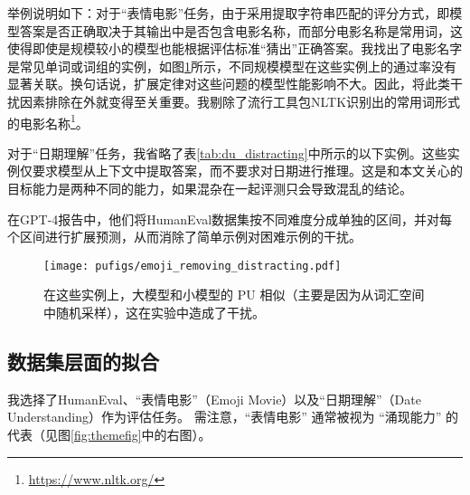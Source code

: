 举例说明如下：对于“表情电影”任务，由于采用提取字符串匹配的评分方式，即模型答案是否正确取决于其输出中是否包含电影名称，而部分电影名称是常用词，这使得即使是规模较小的模型也能根据评估标准“猜出”正确答案。我找出了电影名字是常见单词或词组的实例，如图\ref{fig:emoji_common_words}所示，不同规模模型在这些实例上的通过率没有显著关联。换句话说，扩展定律对这些问题的模型性能影响不大。因此，将此类干扰因素排除在外就变得至关重要。我剔除了流行工具包NLTK识别出的常用词形式的电影名称\footnote{\url{https://www.nltk.org/}}。

对于“日期理解”任务，我省略了表\ref{tab:du_distracting}中所示的以下实例。这些实例仅要求模型从上下文中提取答案，而不要求对日期进行推理。这是和本文关心的目标能力是两种不同的能力，如果混杂在一起评测只会导致混乱的结论。

在GPT-4报告\citep{openai2023gpt4}中，他们将HumanEval数据集按不同难度分成单独的区间，并对每个区间进行扩展预测，从而消除了简单示例对困难示例的干扰。

\begin{table}[!htbp]
\centering
\caption{“日期理解”任务中的干扰实例。}
    \label{tab:du_distracting}
\end{table}

\begin{figure}[h]
    \centering
\texttt{[image: pufigs/emoji\_removing\_distracting.pdf]}
\caption{在这些实例上，大模型和小模型的 \textsc{PU} 相似（主要是因为从词汇空间中随机采样），这在实验中造成了干扰。}
    \label{fig:emoji_common_words}
\end{figure}



\subsection{数据集层面的拟合}
我选择了HumanEval\citep{chen2021evaluating}、“表情电影”（Emoji Movie）以及“日期理解”（Date Understanding）\citep{srivastava2022beyond}作为评估任务。
需注意，“表情电影” 通常被视为 “涌现能力” 的代表\citep{srivastava2022beyond}（见图\ref{fig:themefig}中的右图）。


